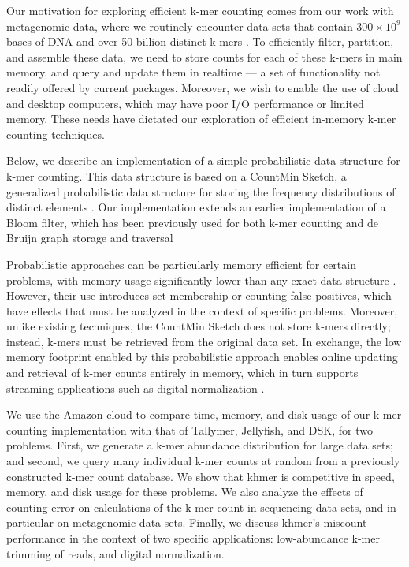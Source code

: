 \documentclass{article}
\begin{document}
Our motivation for exploring efficient k-mer counting comes from our
work with metagenomic data, where we routinely encounter data sets
that contain $300 \times 10^9$ bases of DNA and over 50 billion
distinct k-mers \cite{Howe2012}.  To efficiently filter,
partition, and assemble these data, we need to store counts for each
of these k-mers in main memory, and query and update them in realtime
--- a set of functionality not readily offered by current packages.
Moreover, we wish to enable the use of cloud and desktop
computers, which may have poor I/O performance or limited memory. These
needs have
dictated our exploration of efficient in-memory k-mer counting
techniques.


Below, we describe an implementation of a simple probabilistic data
structure for k-mer counting.  This data structure is based on a
CountMin Sketch, a generalized probabilistic data structure for
storing the frequency distributions of distinct elements
\cite{Cormode2005}.  Our implementation extends an earlier
implementation of a Bloom filter, which has been previously used for
both k-mer counting and de Bruijn graph storage and traversal
\cite{Bloom70,BroderM03,Melsted2011,Pell2012,Rizk2013,Jones2012}

Probabilistic approaches can be particularly memory efficient for
certain problems, with memory usage significantly lower than any exact
data structure \cite{Pell2012}.  However, their use introduces set
membership or counting false positives, which have effects that must
be analyzed in the context of specific problems.  Moreover, unlike
existing techniques, the CountMin Sketch does not store k-mers directly;
instead,
k-mers must be retrieved from the original data set.  In exchange,
the low memory footprint enabled by this probabilistic approach enables
online updating and retrieval of k-mer counts entirely in memory, which
in turn supports streaming applications such as digital normalization
\cite{Brown2012}.

We use the Amazon cloud to compare time, memory, and disk usage of our k-mer counting
implementation with that of Tallymer, Jellyfish, and DSK, for two problems. First, we generate a k-mer abundance distribution for large
data sets; and second, we query many individual k-mer counts at random from
a previously constructed k-mer count database.  We show that khmer
is competitive in speed, memory, and disk usage for these
problems.  We also analyze the effects of counting error on
calculations of the k-mer count in sequencing data sets,
and in particular on metagenomic data sets.  Finally, we discuss
khmer's miscount performance in the context of two specific applications:
low-abundance k-mer trimming of reads, and digital normalization.
\end{document}
